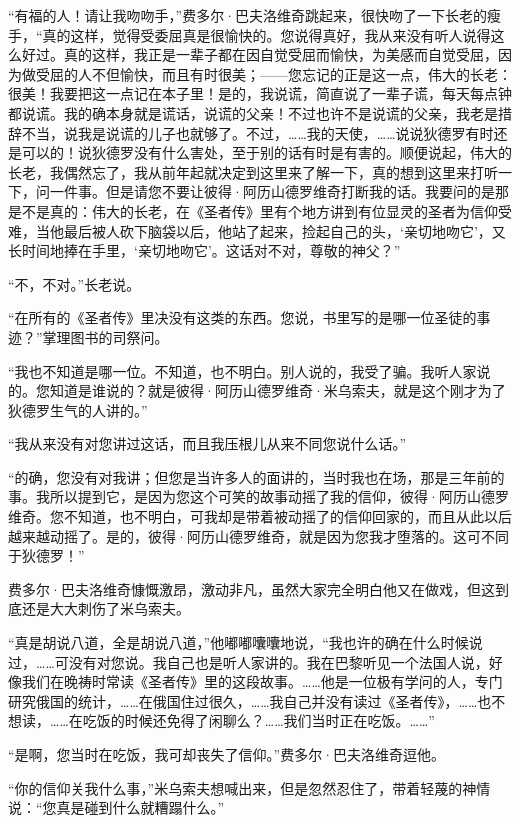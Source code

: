 \par “有福的人！请让我吻吻手，”费多尔·巴夫洛维奇跳起来，很快吻了一下长老的瘦手，“真的这样，觉得受委屈真是很愉快的。您说得真好，我从来没有听人说得这么好过。真的这样，我正是一辈子都在因自觉受屈而愉快，为美感而自觉受屈，因为做受屈的人不但愉快，而且有时很美；——您忘记的正是这一点，伟大的长老：很美！我要把这一点记在本子里！是的，我说谎，简直说了一辈子谎，每天每点钟都说谎。我的确本身就是谎话，说谎的父亲！不过也许不是说谎的父亲，我老是措辞不当，说我是说谎的儿子也就够了。不过，……我的天使，……说说狄德罗有时还是可以的！说狄德罗没有什么害处，至于别的话有时是有害的。顺便说起，伟大的长老，我偶然忘了，我从前年起就决定到这里来了解一下，真的想到这里来打听一下，问一件事。但是请您不要让彼得·阿历山德罗维奇打断我的话。我要问的是那是不是真的：伟大的长老，在《圣者传》里有个地方讲到有位显灵的圣者为信仰受难，当他最后被人砍下脑袋以后，他站了起来，捡起自己的头，‘亲切地吻它’，又长时间地捧在手里，‘亲切地吻它’。这话对不对，尊敬的神父？”
\par “不，不对。”长老说。
\par “在所有的《圣者传》里决没有这类的东西。您说，书里写的是哪一位圣徒的事迹？”掌理图书的司祭问。
\par “我也不知道是哪一位。不知道，也不明白。别人说的，我受了骗。我听人家说的。您知道是谁说的？就是彼得·阿历山德罗维奇·米乌索夫，就是这个刚才为了狄德罗生气的人讲的。”
\par “我从来没有对您讲过这话，而且我压根儿从来不同您说什么话。”
\par “的确，您没有对我讲；但您是当许多人的面讲的，当时我也在场，那是三年前的事。我所以提到它，是因为您这个可笑的故事动摇了我的信仰，彼得·阿历山德罗维奇。您不知道，也不明白，可我却是带着被动摇了的信仰回家的，而且从此以后越来越动摇了。是的，彼得·阿历山德罗维奇，就是因为您我才堕落的。这可不同于狄德罗！”
\par 费多尔·巴夫洛维奇慷慨激昂，激动非凡，虽然大家完全明白他又在做戏，但这到底还是大大刺伤了米乌索夫。
\par “真是胡说八道，全是胡说八道，”他嘟嘟囔囔地说，“我也许的确在什么时候说过，……可没有对您说。我自己也是听人家讲的。我在巴黎听见一个法国人说，好像我们在晚祷时常读《圣者传》里的这段故事。……他是一位极有学问的人，专门研究俄国的统计，……在俄国住过很久，……我自己并没有读过《圣者传》，……也不想读，……在吃饭的时候还免得了闲聊么？……我们当时正在吃饭。……”
\par “是啊，您当时在吃饭，我可却丧失了信仰。”费多尔·巴夫洛维奇逗他。
\par “你的信仰关我什么事，”米乌索夫想喊出来，但是忽然忍住了，带着轻蔑的神情说：“您真是碰到什么就糟蹋什么。”
